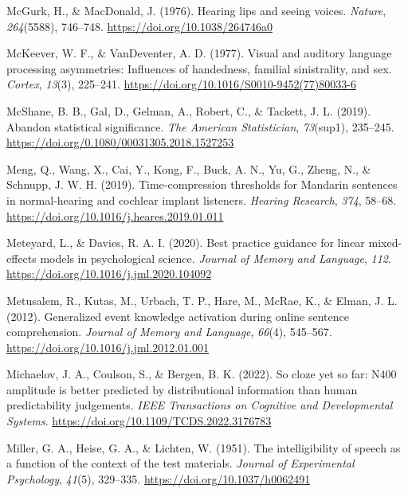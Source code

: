 \documentclass[a4paper, nobind]{templates/ociamthesis}
\newlength{\cslhangindent}
\newenvironment{CSLReferences}[2] %
 {%
  \setlength{\parindent}{0pt}
  \ifodd #1
  \let\oldpar\par
  \def\par{\hangindent=\cslhangindent\oldpar}
  \fi
  \setlength{\parskip}{1mm}
  \setlength{\baselineskip}{6mm}
 }%
 {}
\begin{document}
\begin{CSLReferences}{1}{0}
\leavevmode{}%
McGurk, H., \& MacDonald, J. (1976). Hearing lips and seeing voices. \emph{Nature}, \emph{264}(5588), 746--748. \url{https://doi.org/10.1038/264746a0}

\leavevmode{}%
McKeever, W. F., \& VanDeventer, A. D. (1977). Visual and auditory language processing asymmetries: Influences of handedness, familial sinistrality, and sex. \emph{Cortex}, \emph{13}(3), 225--241. \url{https://doi.org/10.1016/S0010-9452(77)80033-6}

\leavevmode{}%
McShane, B. B., Gal, D., Gelman, A., Robert, C., \& Tackett, J. L. (2019). Abandon statistical significance. \emph{The American Statistician}, \emph{73}(sup1), 235--245. \url{https://doi.org/0.1080/00031305.2018.1527253}

\leavevmode{}%
Meng, Q., Wang, X., Cai, Y., Kong, F., Buck, A. N., Yu, G., Zheng, N., \& Schnupp, J. W. H. (2019). {Time-compression thresholds for Mandarin sentences in normal-hearing and cochlear implant listeners}. \emph{Hearing Research}, \emph{374}, 58--68. \url{https://doi.org/10.1016/j.heares.2019.01.011}

\leavevmode{}%
Meteyard, L., \& Davies, R. A. I. (2020). {Best practice guidance for linear mixed-effects models in psychological science}. \emph{Journal of Memory and Language}, \emph{112}. \url{https://doi.org/10.1016/j.jml.2020.104092}

\leavevmode{}%
Metusalem, R., Kutas, M., Urbach, T. P., Hare, M., McRae, K., \& Elman, J. L. (2012). Generalized event knowledge activation during online sentence comprehension. \emph{Journal of Memory and Language}, \emph{66}(4), 545--567. \url{https://doi.org/10.1016/j.jml.2012.01.001}

\leavevmode{}%
Michaelov, J. A., Coulson, S., \& Bergen, B. K. (2022). So cloze yet so far: N400 amplitude is better predicted by distributional information than human predictability judgements. \emph{IEEE Transactions on Cognitive and Developmental Systems}. \url{https://doi.org/10.1109/TCDS.2022.3176783}

\leavevmode{}%
Miller, G. A., Heise, G. A., \& Lichten, W. (1951). {The intelligibility of speech as a function of the context of the test materials}. \emph{Journal of Experimental Psychology}, \emph{41}(5), 329--335. \url{https://doi.org/10.1037/h0062491}


\end{CSLReferences}
\end{document}
